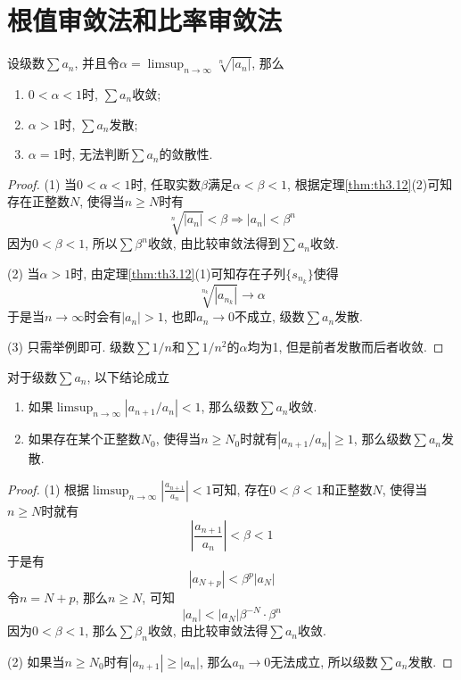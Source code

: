 \documentclass[cn,12pt,math=mtpro2,citestyle=gb7714-2015,bibstyle=gb7714-2015,twocol]{elegantbook}
\begin{document}
\section{根值审敛法和比率审敛法}
\begin{theorem}[根值审敛法]
  设级数$\sum a_n$, 并且令$\alpha=\displaystyle \limsup_{n\to\infty} \sqrt[n]{|a_n|}$, 那么
  \begin{enumerate}[label=(\arabic*)]
  \item $0<\alpha<1$时, $\sum a_n$收敛;

  \item $\alpha>1$时, $\sum a_n$发散;

  \item $\alpha=1$时, 无法判断$\sum a_n$的敛散性.
  \end{enumerate}
\end{theorem}
\begin{proof}
  (1) 当$0<\alpha<1$时, 任取实数$\beta$满足$\alpha<\beta<1$, 根据定理\ref{thm:th3.12}(2)可知存在正整数$N$, 使得当$n\geq N$时有
  $$\sqrt[n]{|a_n|}<\beta\Rightarrow |a_n|<\beta^n$$
  因为$0<\beta<1$, 所以$\sum \beta^n$收敛, 由比较审敛法得到$\sum a_n$收敛.

  (2) 当$\alpha>1$时, 由定理\ref{thm:th3.12}(1)可知存在子列$\{s_{n_k}\}$使得
  $$\sqrt[n_k]{|a_{n_k}|}\rightarrow \alpha$$
  于是当$n\rightarrow\infty$时会有$|a_n|>1$, 也即$a_n\rightarrow0$不成立, 级数$\sum a_n$发散.

  (3) 只需举例即可. 级数$\sum 1/n$和$\sum 1/n^2$的$\alpha$均为1, 但是前者发散而后者收敛.
\end{proof}
\begin{theorem}[比率审敛法]
  对于级数$\sum a_n$, 以下结论成立
  \begin{enumerate}[label=(\arabic*)]
  \item 如果$ \limsup_{n\to\infty}\left|a_{n+1}/{a_n}\right|<1$, 那么级数$\sum a_n$收敛.

  \item 如果存在某个正整数$N_0$, 使得当$n\geq N_0$时就有$\left|a_{n+1}/{a_n}\right|\geq 1$, 那么级数$\sum a_n$发散.
  \end{enumerate}
\end{theorem}
\begin{proof}
  (1) 根据$\displaystyle \limsup_{n\to\infty}\left|\frac{a_{n+1}}{a_n}\right|<1$可知, 存在$0<\beta<1$和正整数$N$, 使得当$n\geq N$时就有
  $$\left|\frac{a_{n+1}}{a_n}\right|<\beta<1$$
  于是有
  $$|a_{N+p}|<\beta^p|a_N|$$
  令$n=N+p$, 那么$n\geq N$, 可知
  $$|a_n|<|a_N|\beta^{-N}\cdot\beta^n$$
  因为$0<\beta<1$, 那么$\sum\beta_n$收敛, 由比较审敛法得$\sum a_n$收敛.

  (2) 如果当$n\geq N_0$时有$|a_{n+1}|\geq|a_n|$, 那么$a_n\rightarrow0$无法成立, 所以级数$\sum a_n$发散.
\end{proof}
\end{document}
